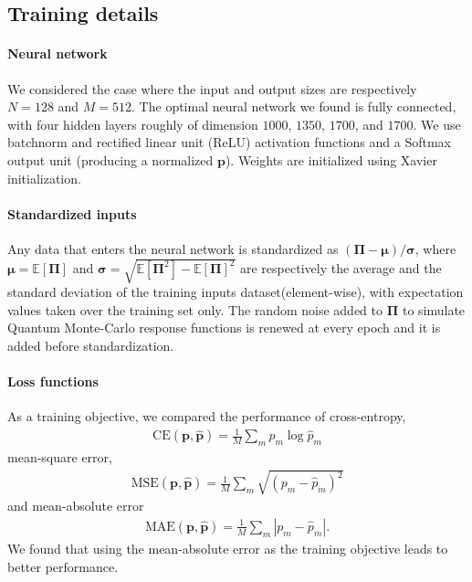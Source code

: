 \documentclass[notitlepage, 11pt, nofootinbib]{revtex4-1}
\renewcommand{\vec}[1]{\bm{#1}}
\begin{document}
\subsection{Training details}
\label{sec_training}


\paragraph*{Neural network} We considered the case where the input and output sizes are respectively $N=128$ and $M=512$. The optimal neural network we found is fully connected, with four hidden layers roughly of dimension $1000$, $1350$, $1700$, and $1700$. We use batchnorm and rectified linear unit (ReLU) activation functions and a Softmax output unit (producing a normalized $\vec p$). Weights are initialized using Xavier initialization.

\paragraph*{Standardized inputs} Any data that enters the neural network is standardized as $(\vec \Pi - \vec\mu)/\vec\sigma$, where $\vec \mu = \mathbb{E}[\vec \Pi]$ and $\vec \sigma = \sqrt{\mathbb{E}[\vec \Pi^2] - \mathbb{E}[\vec \Pi]^2}$ are respectively the average and the standard deviation of the training inputs dataset(element-wise), with expectation values taken over the training set only. The random noise added to $\vec \Pi$ to simulate Quantum Monte-Carlo response functions is renewed at every epoch and it is added before standardization.

\paragraph*{Loss functions} As a training objective, we compared the performance of cross-entropy, 
\begin{align}
    \text{CE}(\vec p,\hat{\vec p}) = \frac{1}{M}\sum_m p_m \log \hat{p}_m
\end{align}
mean-square error, 
\begin{align}
    \text{MSE}(\vec p,\hat{\vec p}) = \frac{1}{M}\sum_m \sqrt{(p_m - \hat{p}_m)^2}
\end{align}
and mean-absolute error
\begin{align}
    \text{MAE}(\vec p,\hat{\vec p}) = \frac{1}{M}\sum_m |p_m - \hat{p}_m|.
\end{align}
We found that using the mean-absolute error as the training objective leads to better performance.
\end{document}
